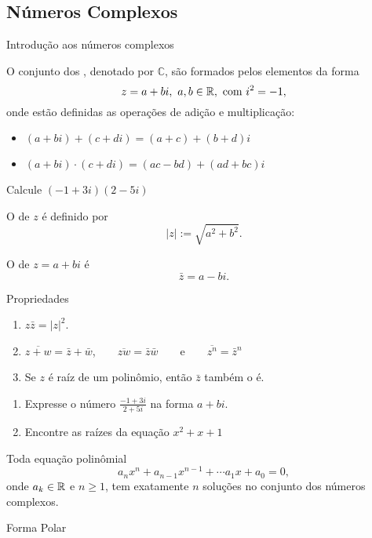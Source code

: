 \subsection*{Números Complexos}


\begin{frame}{Introdução aos números complexos\footnotemark}

 O conjunto dos , denotado por  $\mathbb{C}$, são formados pelos elementos da forma
\[z=a+bi,\ a,b\in \mathbb{R}, \text{ com }  i^2=-1,\]
onde estão definidas as operações de adição e multiplicação:
\begin{itemize}
\item $(a+bi)+(c+di)=(a+c)+(b+d)i$
\item $(a+bi)\cdot(c+di)=(ac-bd)+(ad+bc)i$
\end{itemize}

\begin{exe}
 Calcule $(-1+3i)(2-5i)$
\end{exe}

\end{frame}


\begin{frame}
O   de $z$ é definido por 
\[|z|:=\sqrt{a^2+b^2}.\] 

O  de $z=a+bi$ é 
\[\bar{z}=a-bi.\]


\begin{block}{Propriedades}
\begin{enumerate}
\item $z\bar{z}=|z|^2$.
\item $\overline{z+w}=\bar{z}+\bar{w}$,\ \ \ \ $\overline{zw}=\bar{z}\bar{w}$\ \ \ \ e\ \ \ \ $\overline{z^n}=\bar{z}^n$

\item Se $z$ é raíz de um polinômio, então $\bar{z}$ também o é.
\end{enumerate}
\end{block}



\end{frame}

\begin{frame}
\begin{exe}
\begin{enumerate}
\item Expresse o número $\frac{-1+3i}{2+5i}$ na forma $a+bi$.

\item Encontre as raízes da equação $x^2+x+1$
\end{enumerate}
\end{exe}

\begin{teo}
Toda equação polinômial 
\[a_nx^n+a_{n-1}x^{n-1}+\cdots a_1x+a_0=0,\]
onde $a_k\in \mathbb{R}$ e $n\geq 1$, tem exatamente $n$ soluções no conjunto dos números complexos.
\end{teo}
\end{frame}

\begin{frame}{Forma Polar}

\end{frame}
